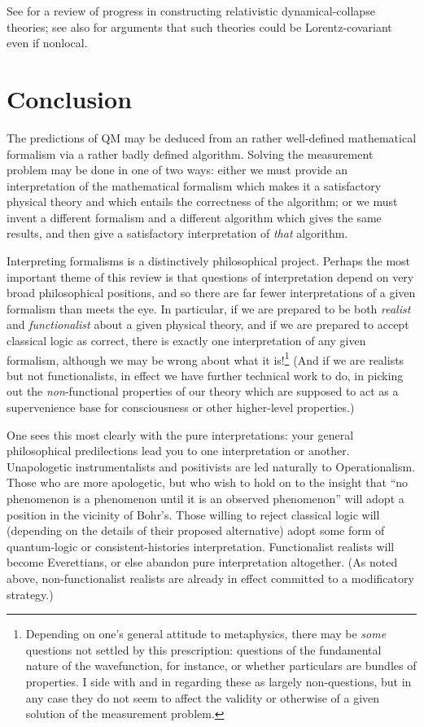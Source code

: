 \documentclass[12pt]{article}
\begin{document}
See  for a review of progress in constructing relativistic dynamical-collapse theories; see also  for arguments that such theories could be Lorentz-covariant even if nonlocal.


\section{Conclusion}\label{DMWWconclusion}

The predictions of QM may be deduced from an rather well-defined mathematical formalism via a rather badly defined algorithm. Solving the measurement problem may be done in one of two ways: either we must provide an interpretation of the mathematical formalism which makes it a satisfactory physical theory and which entails the correctness of the algorithm; or we must invent a different formalism and a different algorithm which gives the same results, and then give a satisfactory interpretation of \emph{that} algorithm.



Interpreting formalisms is a distinctively philosophical project. Perhaps the most important theme of this review is that questions of interpretation depend on very broad philosophical positions, and so there are far fewer interpretations of a given formalism than meets the eye. In particular, if we are prepared to be both \emph{realist} and \emph{functionalist} about a given physical theory, and if we are prepared to accept classical logic as correct, there is exactly one interpretation of any given formalism, although we may be wrong about what it is!\footnote{Depending on one's general attitude to metaphysics, there may be \emph{some} questions not settled by this prescription: questions of the fundamental nature of the wavefunction, for instance, or whether particulars are bundles of properties. I side with  and  in regarding these as largely non-questions, but in any case they do not seem to affect the validity or otherwise of a given solution of the measurement problem.} (And if we are realists but not functionalists, in effect we have further technical work to do, in picking out the \emph{non}-functional properties of our theory which are supposed to act as a supervenience base for consciousness or other higher-level properties.)

One sees this most clearly with the pure interpretations: your  general philosophical predilections lead you to one interpretation or another. Unapologetic instrumentalists and positivists are led naturally to Operationalism. Those who are more apologetic, but who wish to hold on to the insight that ``no phenomenon is a phenomenon until it is an observed phenomenon'' will adopt a position in the vicinity of Bohr's. Those willing to reject classical logic will (depending on the details of their proposed alternative) adopt some form of quantum-logic or consistent-histories interpretation. Functionalist realists will become Everettians, or else abandon pure interpretation altogether. (As noted above, non-functionalist realists are already in effect committed to a modificatory strategy.) 
\end{document}
